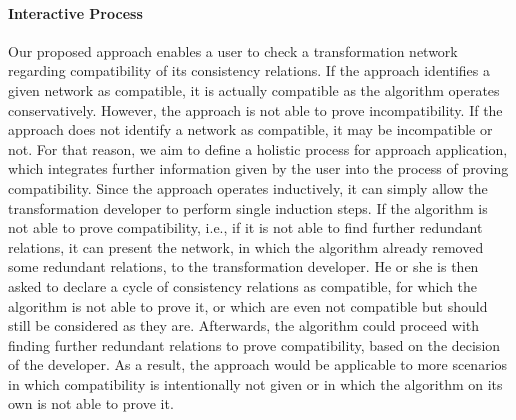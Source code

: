 \paragraph{Interactive Process}
\label{chap:futurework:correctness:compatibility:process}
Our proposed approach enables a user to check a transformation network regarding compatibility of its consistency relations.
If the approach identifies a given network as compatible, it is actually compatible as the algorithm operates conservatively.
However, the approach is not able to prove incompatibility. If the approach does not identify a network as compatible, it may be incompatible or not.
For that reason, we aim to define a holistic process for approach application, which integrates further information given by the user into the process of proving compatibility.
Since the approach operates inductively, it can simply allow the transformation developer to perform single induction steps.
If the algorithm is not able to prove compatibility, i.e., if it is not able to find further redundant relations, it can present the network, in which the algorithm already removed some redundant relations, to the transformation developer.
He or she is then asked to declare a cycle of consistency relations as compatible, for which the algorithm is not able to prove it, or which are even not compatible but should still be considered as they are.
Afterwards, the algorithm could proceed with finding further redundant relations to prove compatibility, based on the decision of the developer.
As a result, the approach would be applicable to more scenarios in which compatibility is intentionally not given or in which the algorithm on its own is not able to prove it.


